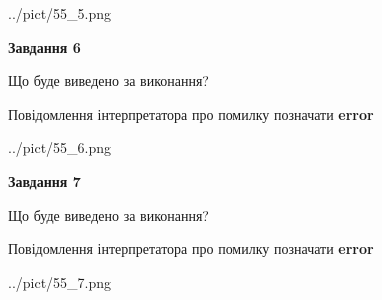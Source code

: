 \documentclass[10pt, ukrainian]{article}
\begin{document}
{\begin {large}
\begin{center}
	{../pict/55_5.png}
\end{center}
\newpage

{\begin {center}\textbf{Завдання 6}\end {center}}\par
Що буде виведено за виконання? \par
Повідомлення інтерпретатора про помилку позначати \textbf{error}

\begin{center}
	{../pict/55_6.png}
\end{center}
\newpage

{\begin {center}\textbf{Завдання 7}\end {center}}\par
Що буде виведено за виконання? \par
Повідомлення інтерпретатора про помилку позначати \textbf{error}

\begin{center}
	{../pict/55_7.png}
\end{center}
\newpage

\end {large}}
\end{document}
